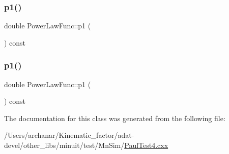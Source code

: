 \mbox{\label{classPowerLawFunc_a99c19d6a15b5efa68b17875afc619b08}} 
\subsubsection{\texorpdfstring{p1()}{p1()}\hspace{0.1cm}{\footnotesize\ttfamily [1/2]}}
{\footnotesize\ttfamily double Power\+Law\+Func\+::p1 (\begin{DoxyParamCaption}{ }\end{DoxyParamCaption}) const\hspace{0.3cm}{\ttfamily [inline]}}

\mbox{\label{classPowerLawFunc_a99c19d6a15b5efa68b17875afc619b08}} 
\subsubsection{\texorpdfstring{p1()}{p1()}\hspace{0.1cm}{\footnotesize\ttfamily [2/2]}}
{\footnotesize\ttfamily double Power\+Law\+Func\+::p1 (\begin{DoxyParamCaption}{ }\end{DoxyParamCaption}) const\hspace{0.3cm}{\ttfamily [inline]}}



The documentation for this class was generated from the following file\+:\begin{DoxyCompactItemize}
\item 
/\+Users/archanar/\+Kinematic\+\_\+factor/adat-\/devel/other\+\_\+libs/minuit/test/\+Mn\+Sim/\mbox{\hyperlink{adat-devel_2other__libs_2minuit_2test_2MnSim_2PaulTest4_8cxx}{Paul\+Test4.\+cxx}}\end{DoxyCompactItemize}
